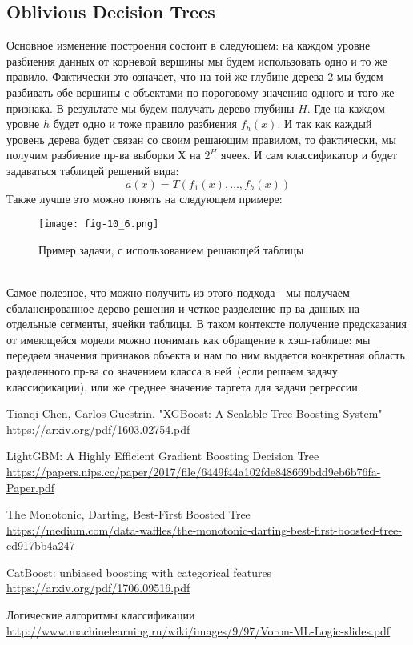 \documentclass[12pt,fleqn]{article}
\begin{document}
\subsection{Oblivious Decision Trees}
Основное изменение построения состоит в следующем: на каждом уровне разбиения данных от корневой вершины мы будем использовать одно и то же правило. Фактически это означает, что на той же глубине дерева 2 мы будем разбивать обе вершины с объектами по пороговому значению одного и того же признака. В результате мы будем получать дерево глубины $H$. Где на каждом уровне $h$ будет одно и тоже правило разбиения $f_h(x)$. И так как каждый уровень дерева будет связан со своим решающим правилом, то фактически, мы получим разбиение пр-ва выборки Х на $2^H$ ячеек. И сам классификатор и будет задаваться таблицей решений вида:
$$
a(x)=T(f_1(x),\dots,f_h(x))
$$
Также лучше это можно понять на следующем примере:
\begin{figure}[h]
	\centering
	\texttt{[image: fig-10\_6.png]}
	\caption{Пример задачи, с использованием решающей таблицы}
	\label{fig:terms_6}
\end{figure}\\
Самое полезное, что можно получить из этого подхода - мы получаем сбалансированное дерево решения и четкое разделение пр-ва данных на отдельные сегменты, ячейки таблицы. В таком контексте получение предсказания от имеющейся модели можно понимать как обращение к хэш-таблице: мы передаем значения признаков объекта и нам по ним выдается конкретная область разделенного пр-ва со значением класса в ней~(если решаем задачу классификации), или же среднее значение таргета для задачи регрессии.
\newpage
\begin{thebibliography}{9}
	Tianqi Chen, Carlos Guestrin. "XGBoost: A Scalable Tree Boosting System"\\
	\url{https://arxiv.org/pdf/1603.02754.pdf}
	
	LightGBM: A Highly Efficient Gradient Boosting
	Decision Tree\\
	\url{https://papers.nips.cc/paper/2017/file/6449f44a102fde848669bdd9eb6b76fa-Paper.pdf}
	
	The Monotonic, Darting, Best-First Boosted Tree\\
	\url{https://medium.com/data-waffles/the-monotonic-darting-best-first-boosted-tree-cd917bb4a247}
	
	CatBoost: unbiased boosting with categorical features\\
	\url{https://arxiv.org/pdf/1706.09516.pdf}
	
	Логические алгоритмы классификации\\
	\url{http://www.machinelearning.ru/wiki/images/9/97/Voron-ML-Logic-slides.pdf}
\end{thebibliography}
\end{document}
